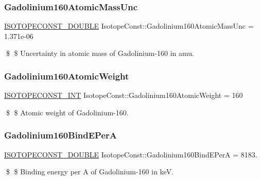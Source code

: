\subsubsection{\texorpdfstring{Gadolinium160\+Atomic\+Mass\+Unc}{Gadolinium160AtomicMassUnc}}
{\footnotesize\ttfamily \mbox{\hyperlink{group___isotope_const-_macros_ga8f45a7272ce02c0b4c65c44636ed719a}{I\+S\+O\+T\+O\+P\+E\+C\+O\+N\+S\+T\+\_\+\+D\+O\+U\+B\+LE}} Isotope\+Const\+::\+Gadolinium160\+Atomic\+Mass\+Unc = 1.\+371e-\/06}

\$ \$ Uncertainty in atomic mass of Gadolinium-\/160 in amu. \mbox{\label{group___isotope_const-_gadolinium-_gd160_gac1925bcbe6c56762dbefdca653d80438}} 
\subsubsection{\texorpdfstring{Gadolinium160\+Atomic\+Weight}{Gadolinium160AtomicWeight}}
{\footnotesize\ttfamily \mbox{\hyperlink{group___isotope_const-_macros_ga5f18360b3e99483a35c32d789e62621c}{I\+S\+O\+T\+O\+P\+E\+C\+O\+N\+S\+T\+\_\+\+I\+NT}} Isotope\+Const\+::\+Gadolinium160\+Atomic\+Weight = 160}

\$ \$ Atomic weight of Gadolinium-\/160. \mbox{\label{group___isotope_const-_gadolinium-_gd160_ga05778b0f9cb5fa10f67852ed57785740}} 
\subsubsection{\texorpdfstring{Gadolinium160\+Bind\+E\+PerA}{Gadolinium160BindEPerA}}
{\footnotesize\ttfamily \mbox{\hyperlink{group___isotope_const-_macros_ga8f45a7272ce02c0b4c65c44636ed719a}{I\+S\+O\+T\+O\+P\+E\+C\+O\+N\+S\+T\+\_\+\+D\+O\+U\+B\+LE}} Isotope\+Const\+::\+Gadolinium160\+Bind\+E\+PerA = 8183.}

\$ \$ Binding energy per A of Gadolinium-\/160 in keV. \mbox{\label{group___isotope_const-_gadolinium-_gd160_gae8bf27e4ea4e1df41e58b44e2fc058f2}} 
